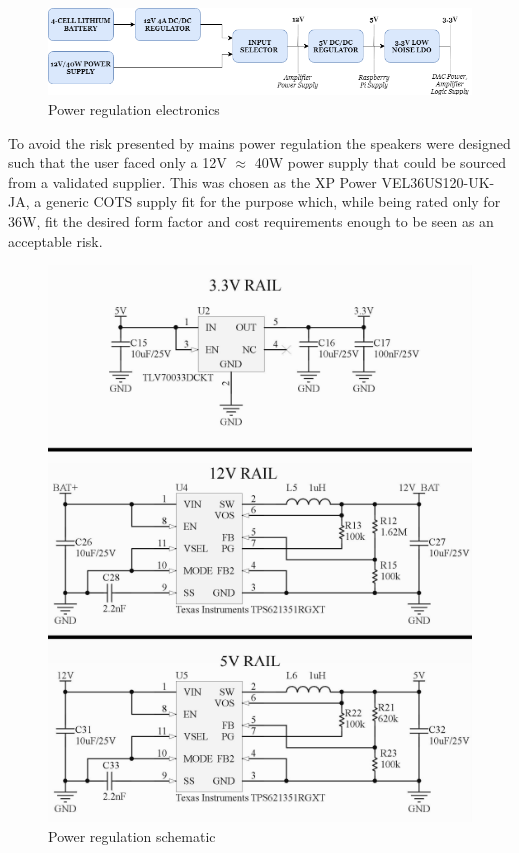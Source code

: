 \documentclass[main.tex]{subfiles}
\begin{document}
\begin{figure}[H]
    \centering
    \includegraphics[scale=0.6]{./figs/power-system.png}
    \caption{Power regulation electronics}
    \label{fig:power-system}
\end{figure}

To avoid the risk presented by mains power regulation the speakers were designed such that the user faced only a 12V $\approx$ 40W power supply that could be sourced from a validated supplier. This was chosen as the XP Power VEL36US120-UK-JA, a generic COTS supply fit for the purpose which, while being rated only for 36W, fit the desired form factor and cost requirements enough to be seen as an acceptable risk.

\begin{figure}[H]
    \centering
    \includegraphics[scale=1.2]{./figs/power-circuit.PNG}
    \caption{Power regulation schematic}
    \label{fig:power-circuit}
\end{figure}
\end{document}
